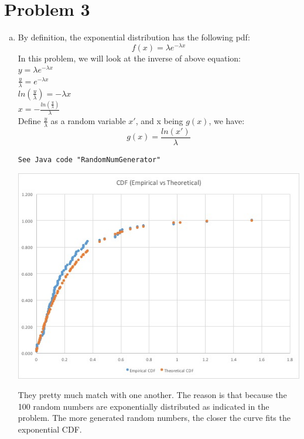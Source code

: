 \documentclass{article}   	                         %
\begin{document}
\section*{Problem 3}
\begin{enumerate}[(a)]
\item
By definition, the exponential distribution has the following pdf:\\
\begin{equation} f(x) = \lambda e^{-\lambda x}\end{equation} 
In this problem, we will look at the inverse of above equation:\\
$y = \lambda e^{-\lambda x}$\\
$\frac{y}{\lambda} = e^{-\lambda x}$\\
$ln (\frac{y}{\lambda}) = -\lambda x $\\
$x = -\frac{ln (\frac{y}{\lambda})}{\lambda}$\\
Define $\frac{y}{\lambda}$ as a random variable $x\prime$, and x being $g(x)$, we have:\\
\begin{equation} g(x) = \frac{ln (x\prime)}{\lambda}\end{equation} 
\begin{BVerbatim}
See Java code "RandomNumGenerator"
\end{BVerbatim}
\begin{center}
\includegraphics[scale = 0.45]{Picture2.jpg}
\end{center}
They pretty much match with one another. The reason is that because the 100 random numbers are exponentially distributed as indicated in the problem. The more generated random numbers, the closer the curve fits the exponential CDF.

\end{enumerate}
\end{document}
